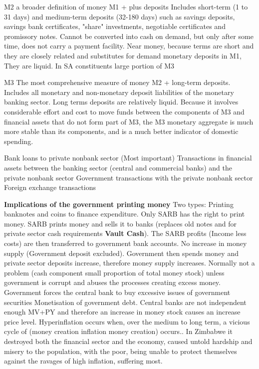 \documentclass[12pt]{examnotes}
\begin{document}
 M2 
\rna a broader definition of money
\rna M1 + plus deposits
\rna Includes short-term (1 to 31 days) and medium-term deposits (32-180 days) such as savings deposits, savings bank certificates, "share" investments, negotiable certificates and promissory notes.
\rna Cannot be converted into cash on demand, but only after some time, does not carry a payment facility.
\rna Near money, because terms are short and they are closely related and substitutes for demand monetary deposits in M1, 
\rna They are liquid.
\rna In SA constituents large portion of M3

 M3
\rna The most comprehensive measure of money
\rna M2 + long-term deposits.
\rna Includes all monetary and non-monetary deposit liabilities of the monetary banking sector.
\rna Long terms deposits are relatively liquid.
\rna Because it involves considerable effort and cost to move funds between the components of M3 and financial assets that do not form part of M3, the M3 monetary aggregate is much more stable than its components, and is a much better indicator of domestic spending.

 Bank loans to private nonbank sector (Most important)
 Transactions in financial assets between the banking sector (central and commercial banks) and the private nonbank sector
 Government transactions with the private nonbank sector
 Foreign exchange transactions

\textbf{Implications of the government printing money}
\ra Two types:
 Printing banknotes and coins to finance expenditure. 
\rna Only SARB has the right to print money.
\rna SARB prints money and sells it to banks (replaces old notes and for private sector cash requirements {\bf Vault Cash}). The SARB profits (Income less costs) are then transferred to government bank accounts. No increase in money supply (Government deposit excluded).
\rna Government then spends money and private sector deposits increase, therefore money supply increases.
\rna Normally not a problem (cash component small proportion of total money stock)  unless government is corrupt and abuses the processes creating excess money.
 Government forces the central bank to buy excessive issues of government securities
\rna Monetisation of government debt.
\rna Central banks are not independent enough
\ra MV+PY and therefore an increase in money stock causes an increase price level.
\ra Hyperinflation occurs when, over the medium to long term, a vicious cycle of (money creation \ra   inflation \ra money creation) occurs.. 
\ra In Zimbabwe it destroyed both the financial sector and the economy,  caused untold hardship and misery to the population, with the poor, being unable to protect themselves against the ravages of high inflation, suffering most.
\end{document}
